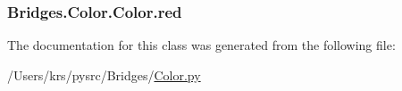 \subsubsection[{red}]{\setlength{\rightskip}{0pt plus 5cm}Bridges.\+Color.\+Color.\+red}\label{class_bridges_1_1_color_1_1_color_a51436cc5661d40acb09332e7bc9a13b7}


The documentation for this class was generated from the following file\+:\begin{DoxyCompactItemize}
\item 
/\+Users/krs/pysrc/\+Bridges/\hyperlink{_color_8py}{Color.\+py}\end{DoxyCompactItemize}
